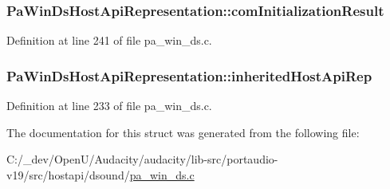 \subsubsection[{\texorpdfstring{com\+Initialization\+Result}{comInitializationResult}}]{ Pa\+Win\+Ds\+Host\+Api\+Representation\+::com\+Initialization\+Result}\hypertarget{struct_pa_win_ds_host_api_representation_aa35ae91c55ac5a54e8eb16682f345ea4}{}\label{struct_pa_win_ds_host_api_representation_aa35ae91c55ac5a54e8eb16682f345ea4}


Definition at line 241 of file pa\+\_\+win\+\_\+ds.\+c.

\subsubsection[{\texorpdfstring{inherited\+Host\+Api\+Rep}{inheritedHostApiRep}}]{ Pa\+Win\+Ds\+Host\+Api\+Representation\+::inherited\+Host\+Api\+Rep}\hypertarget{struct_pa_win_ds_host_api_representation_afdd6db5f0c0af8ad11a2a0d4eab4dfde}{}\label{struct_pa_win_ds_host_api_representation_afdd6db5f0c0af8ad11a2a0d4eab4dfde}


Definition at line 233 of file pa\+\_\+win\+\_\+ds.\+c.



The documentation for this struct was generated from the following file\+:\begin{DoxyCompactItemize}
\item 
C\+:/\+\_\+dev/\+Open\+U/\+Audacity/audacity/lib-\/src/portaudio-\/v19/src/hostapi/dsound/\hyperlink{pa__win__ds_8c}{pa\+\_\+win\+\_\+ds.\+c}\end{DoxyCompactItemize}
